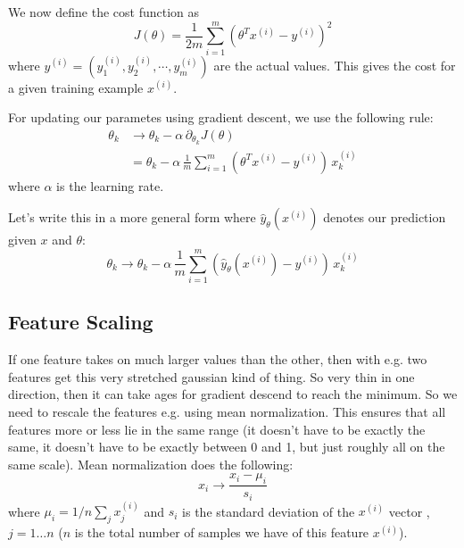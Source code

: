\documentclass[a4paper, 10pt,hidelinks]{article}
\newcommand{\upi}[1]{#1^{(i)}}
\newcommand{\ind}[1]{^{(#1)}}
\begin{document}
We now define the cost function as 
\begin{equation}\label{Eq: Cost function linear regression}
J(\theta) = \frac{1}{2 m} \sum_{i = 1}^m (\theta^T x^{(i)} - y^{(i)})^2
\end{equation}
where $y^{(i)} = (y^{(i)}_1, y^{(i)}_2, \cdots, y^{(i)}_m)$ are the actual values. This gives the cost for a given training example $\upi{x}$.

For updating our parametes using gradient descent, we use the following rule:
\begin{align}
\theta_k &\rightarrow \theta_k - \alpha \, \partial_{\theta_k} J(\theta) \label{Eq: Theta update rule} \\
&= \theta_k - \alpha \, \frac{1}{m} \sum_{i = 1}^m (\theta^T x^{(i)} - y^{(i)}) \,x_k^{(i)} 
\end{align}
where $\alpha$ is the learning rate. 

Let's write this in a more general form where $\hat{y}_{\theta}(x\ind{i})$ denotes our prediction given $x$ and $\theta$:
\begin{equation}\label{Eq: Unregularized theta update rule}
\theta_k \rightarrow \theta_k - \alpha \, \frac{1}{m} \sum_{i = 1}^m (\hat{y}_{\theta}(x\ind{i}) - y^{(i)}) \,x_k^{(i)} 
\end{equation}



\subsection{Feature Scaling}
If one feature takes on much larger values than the other, then with e.g. two features get this very stretched gaussian kind of thing. So very thin in one direction, then it can take ages for gradient descend to reach the minimum. So we need to rescale the features e.g. using mean normalization. This ensures that all features more or less lie in the same range (it doesn't have to be exactly the same, it doesn't have to be exactly between 0 and 1, but just roughly all on the same scale). Mean normalization does the following:
\begin{equation}\label{Eq: Mean norm}
x_i \rightarrow \frac{x_i - \mu_i}{s_i}
\end{equation}
where $\mu_i = 1/n \sum_j x^{(i)}_j$ and $s_i$ is the standard deviation of the $\upi{x}$ vector , $j = 1 \dots n$ ($n$ is the total number of samples we have of this feature $\upi{x}$). 
\end{document}
